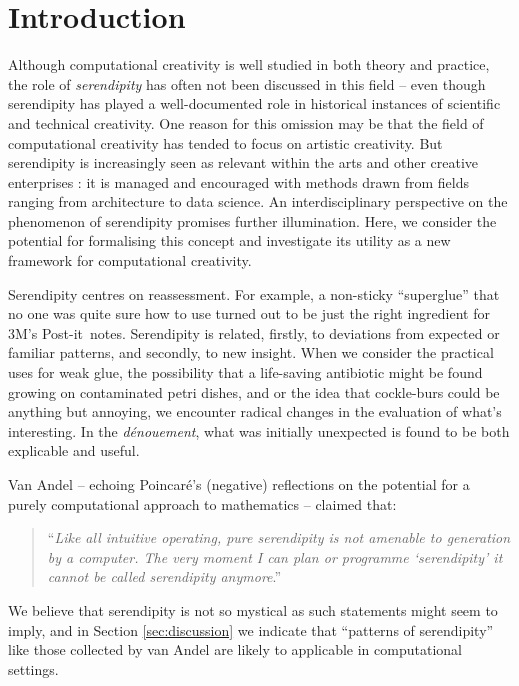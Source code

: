 \section{Introduction}

Although computational creativity is well studied in both theory and
practice, the role of \emph{serendipity} has often not been discussed
in this field -- even though serendipity has played a well-documented
role in historical instances of scientific and technical creativity.
One reason for this omission may be that the field of computational
creativity has tended to focus on artistic creativity.  But
serendipity is increasingly seen as relevant within the arts
\cite{mckay-serendipity} and other creative enterprises
\cite{kakko2009homo,engineering-serendipity}: it is managed and
encouraged with methods drawn from fields ranging from architecture to data science.
%
An interdisciplinary perspective on the phenomenon of serendipity
promises further illumination.  Here, we consider the potential for
formalising this concept and investigate its utility as a new
framework for computational creativity.

Serendipity centres on reassessment.  For example, a non-sticky
``superglue'' that no one was quite sure how to use turned out to be
just the right ingredient for 3M's Post-it\texttrademark\ notes.
%
Serendipity is related, firstly, to deviations from expected or
familiar patterns, and secondly, to new insight.
%
When we consider the practical uses for weak glue, the possibility
that a life-saving antibiotic might be found growing on contaminated
petri dishes, and or the idea that cockle-burs could be anything but
annoying, we encounter radical changes in the evaluation of what's
interesting.  In the \emph{d\'enouement}, what was initially
unexpected is found to be both explicable and useful.

Van Andel \citeyear{van1994anatomy} -- echoing Poincar\'e's
\citeyear{poincare1910creation} (negative) reflections on the potential
for a purely computational approach to mathematics -- claimed that:
\begin{quote}
``\emph{Like all intuitive operating, pure serendipity is not amenable
    to generation by a computer.  The very moment I can plan or
    programme `serendipity' it cannot be called serendipity
    anymore}.'' \cite{van1994anatomy}
\end{quote}
We believe that serendipity is not so mystical as such statements
might seem to imply, and in Section \ref{sec:discussion} we indicate
that ``patterns of serendipity'' like those collected by van Andel
are likely to applicable in computational settings.

